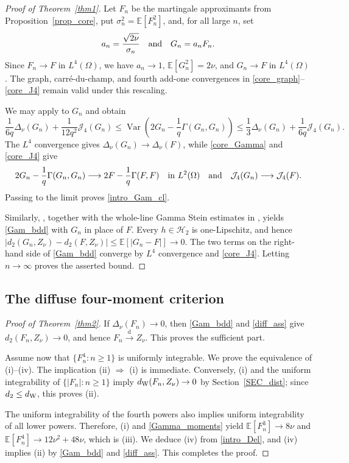 \documentclass[letterpaper,11pt,reqno]{amsart}
\numberwithin{equation}{section}
\theoremstyle{plain}
\theoremstyle{definition}
\theoremstyle{remark}
\newcommand{\E}{\mathbb{E}}
\newcommand{\cH}{\mathcal{H}}
\DeclareMathOperator{\Var}{Var}
\newcommand{\Jfour}{\mathcal J_4}
\newcommand{\dW}{d_{\rm W}}
\newcommand{\Del}{\Delta}
\newcommand{\Gam}{\Gamma}
\newcommand{\AND}{\quad{\rm and}\quad}
\begin{document}
\begin{proof}[Proof of Theorem~\ref{thm1}]
Let $F_n$ be the martingale approximants from
Proposition~\ref{prop_core}, put $\sigma_n^2=\E[F_n^2]$, and, for all
large $n$, set
\[
 a_n=\frac{\sqrt{2\nu}}{\sigma_n}
 \AND
 G_n=a_nF_n.
\]
Since $F_n\to F$ in $L^4(\Omega)$, we have $a_n\to1$,
$\E[G_n^2]=2\nu$, and $G_n\to F$ in $L^4(\Omega)$.  The graph,
carr\'e-du-champ, and fourth add-one convergences in
\eqref{core_graph}--\eqref{core_J4} remain valid under this rescaling.

We may apply \cite[Lemma~5.3]{DP18b} to $G_n$ and obtain
\[
 \frac1{6q}\Del_\nu(G_n)+\frac1{12q^2}\Jfour(G_n)
 \leq\Var\left(2G_n-\frac1q\Gam(G_n,G_n)\right)
 \leq\frac13\Del_\nu(G_n)+\frac1{6q}\Jfour(G_n).
\]
The $L^4$ convergence gives
$\Del_\nu(G_n)\to\Del_\nu(F)$, while \eqref{core_Gamma} and
\eqref{core_J4} give
\[
 2G_n-\frac1q\Gam(G_n,G_n)
 \longrightarrow2F-\frac1q\Gam(F,F)
 \quad\text{in }L^2(\Omega)
 \AND
 \Jfour(G_n)\longrightarrow\Jfour(F).
\]
Passing to the limit proves \eqref{intro_Gam_cl}.

Similarly, \cite[Theorem~1.7]{DP18b}, together with the whole-line
Gamma Stein estimates in \cite[Theorem~2.3]{DP18a}, yields
\eqref{Gam_bdd} with $G_n$ in place of $F$.  Every $h\in\cH_2$ is
one-Lipschitz, and hence
$
 |d_2(G_n,Z_\nu)-d_2(F,Z_\nu)|
 \leq\E[|G_n-F|]\longrightarrow0.
$
The two terms on the right-hand side of \eqref{Gam_bdd} converge by
$L^4$ convergence and \eqref{core_J4}.  Letting $n\to\infty$ proves
the asserted bound.
\end{proof}

\subsection{The diffuse four-moment criterion}
\label{SEC_33}


\begin{proof}[Proof of Theorem~\ref{thm2}]
If $\Del_\nu(F_n)\to0$, then \eqref{Gam_bdd} and \eqref{diff_ass}
give $d_2(F_n,Z_\nu)\to0$, and hence
$F_n\xrightarrow{\mathrm d}Z_\nu$.  This proves the sufficient part.

Assume now that $\{F_n^4:n\geq1\}$ is uniformly integrable.  We prove
the equivalence of \textup{(i)}--\textup{(iv)}.  The implication
\textup{(ii)} $\Rightarrow$ \textup{(i)} is immediate.  Conversely,
\textup{(i)} and the uniform integrability of
$\{|F_n|:n\geq1\}$ imply $\dW(F_n,Z_\nu)\to0$ by
Section~\ref{SEC_dist}; since
$d_2\leq\dW$, this proves \textup{(ii)}.

The uniform integrability of the fourth powers also implies uniform
integrability of all lower powers.  Therefore, \textup{(i)} and
\eqref{Gamma_moments} yield
$\E[F_n^3]\to8\nu$ and
$\E[F_n^4]\to12\nu^2+48\nu$, which is \textup{(iii)}.  We deduce
\textup{(iv)} from \eqref{intro_Del}, and \textup{(iv)} implies
\textup{(ii)} by \eqref{Gam_bdd} and \eqref{diff_ass}.  This completes
the proof.
\end{proof}
\end{document}
